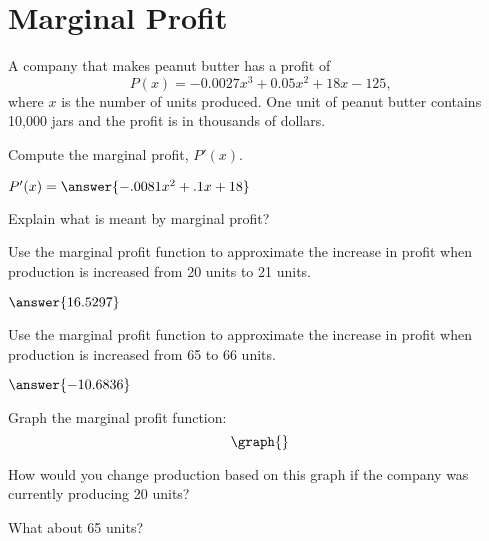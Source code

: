 \documentclass{ximera}
\begin{document}
\section{Marginal Profit}
A company that makes peanut butter has a profit of $$P(x)=-0.0027x^3+0.05x^2+18x-125\text{,}$$ where $x$ is the number of units produced. One unit of peanut butter contains 10,000 jars and the profit is in thousands of dollars.
\begin{question}
Compute the marginal profit, $P'(x)$.

$P'(x)=\answer{-.0081x^2+.1x+18}$

Explain what is meant by marginal profit?
\begin{freeResponse}
\end{freeResponse}

Use the marginal profit function to approximate the increase in profit when production is increased from 20 units to 21 units.

$\answer{16.5297}$

Use the marginal profit function to approximate the increase in profit when production is increased from 65 to 66 units.

$\answer{-10.6836}$

Graph the marginal profit function:
\[
\graph{}
\]

How would you change production based on this graph if the company was currently producing 20 units?

\begin{multipleChoice}
\end{multipleChoice}

What about 65 units?

\begin{multipleChoice}
\end{multipleChoice}
\end{question}
\setcounter{problem}{0}
\end{document}
